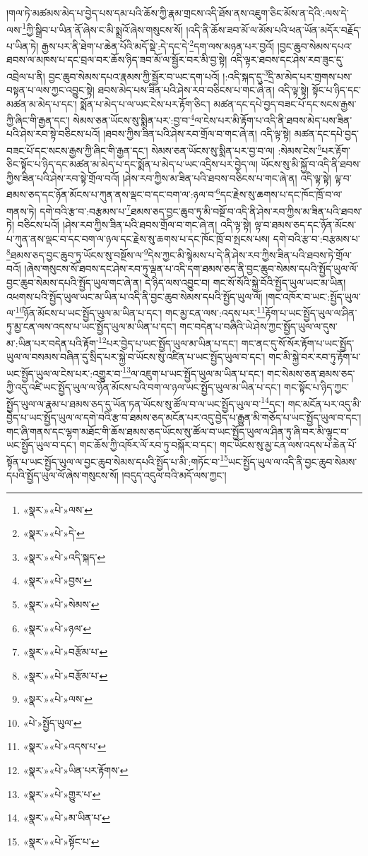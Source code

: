 །གལ་ཏེ་མཚམས་མེད་པ་བྱེད་པས་དམ་པའི་ཆོས་ཀྱི་རྣམ་གྲངས་འདི་ཐོས་ནས་འཇུག་ཅིང་མོས་ན་དེའི་:ལས་དེ་ལས་\footnote{«སྣར་»«པེ་»ལས་}ཀྱི་སྒྲིབ་པ་ཡིན་ནོ་ཞེས་ང་མི་སྨྲའོ་ཞེས་གསུངས་སོ། །འདི་ནི་ཆོས་ཟབ་མོ་ལ་མོས་པའི་ཕན་ཡོན་མདོར་བརྗོད་པ་ཡིན་ཏེ། རྒྱས་པར་ནི་ཐེག་པ་ཆེན་པོའི་མདོ་སྡེ་:དེ་དང་དེ་\footnote{«སྣར་»«པེ་»དེ་}དག་ལས་མཉན་པར་བྱའོ། །བྱང་ཆུབ་སེམས་དཔའ་ཐབས་ལ་མཁས་པ་དང་བྲལ་བར་ཆོས་ཉིད་ཟབ་མོ་ལ་སྦྱོར་བར་མི་བྱ་སྟེ། འདི་ལྟར་ཐབས་དང་ཤེས་རབ་ཟུང་དུ་འབྲེལ་པ་ནི། བྱང་ཆུབ་སེམས་དཔའ་རྣམས་ཀྱི་སྦྱོར་བ་ཡང་དག་པའོ། །:འདི་སྐད་དུ་\footnote{«སྣར་»«པེ་»འདི་སྐད་}དྲི་མ་མེད་པར་གྲགས་པས་བསྟན་པ་ལས་ཀྱང་འབྱུང་སྟེ། ཐབས་མེད་པས་ཟིན་པའི་ཤེས་རབ་བཅིངས་པ་གང་ཞེ་ན། འདི་ལྟ་སྟེ། སྟོང་པ་ཉིད་དང་མཚན་མ་མེད་པ་དང་། སྨོན་པ་མེད་པ་ལ་ཡང་ངེས་པར་རྟོག་ཅིང་། མཚན་དང་དཔེ་བྱད་བཟང་པོ་དང་སངས་རྒྱས་ཀྱི་ཞིང་གི་རྒྱན་དང་། སེམས་ཅན་ཡོངས་སུ་སྨིན་པར་:བྱ་བ་\footnote{«སྣར་»«པེ་»བྱས་}ལ་ངེས་པར་མི་རྟོག་པ་འདི་ནི་ཐབས་མེད་པས་ཟིན་པའི་ཤེས་རབ་སྟེ་བཅིངས་པའོ། །ཐབས་ཀྱིས་ཟིན་པའི་ཤེས་རབ་གྲོལ་བ་གང་ཞེ་ན། འདི་ལྟ་སྟེ། མཚན་དང་དཔེ་བྱད་བཟང་པོ་དང་སངས་རྒྱས་ཀྱི་ཞིང་གི་རྒྱན་དང་། སེམས་ཅན་ཡོངས་སུ་སྨིན་པར་བྱ་བ་ལ། :སེམས་ངེས་\footnote{«སྣར་»«པེ་»སེམས་}པར་རྟོག་ཅིང་སྟོང་པ་ཉིད་དང་མཚན་མ་མེད་པ་དང་སྨོན་པ་མེད་པ་ཡང་འདྲིས་པར་བྱེད་ལ། ཡོངས་སུ་མི་སྐྱོ་བ་འདི་ནི་ཐབས་ཀྱིས་ཟིན་པའི་ཤེས་རབ་སྟེ་གྲོལ་བའོ། །ཤེས་རབ་ཀྱིས་མ་ཟིན་པའི་ཐབས་བཅིངས་པ་གང་ཞེ་ན། འདི་ལྟ་སྟེ། ལྟ་བ་ཐམས་ཅད་དང་ཉོན་མོངས་པ་ཀུན་ནས་ལྡང་བ་དང་བག་ལ་:ཉལ་བ་\footnote{«སྣར་»«པེ་»ཉལ་}དང་རྗེས་སུ་ཆགས་པ་དང་ཁོང་ཁྲོ་བ་ལ་གནས་ཏེ། དགེ་བའི་རྩ་བ་:བརྩམས་པ་\footnote{«སྣར་»«པེ་»བརྩོམ་པ་}ཐམས་ཅད་བྱང་ཆུབ་ཏུ་མི་བསྔོ་བ་འདི་ནི་ཤེས་རབ་ཀྱིས་མ་ཟིན་པའི་ཐབས་ཏེ། བཅིངས་པའོ། །ཤེས་རབ་ཀྱིས་ཟིན་པའི་ཐབས་གྲོལ་བ་གང་ཞེ་ན། འདི་ལྟ་སྟེ། ལྟ་བ་ཐམས་ཅད་དང་ཉོན་མོངས་པ་ཀུན་ནས་ལྡང་བ་དང་བག་ལ་ཉལ་དང་རྗེས་སུ་ཆགས་པ་དང་ཁོང་ཁྲོ་བ་སྤངས་པས། དགེ་བའི་རྩ་བ་:བརྩམས་པ་\footnote{«སྣར་»«པེ་»བརྩོམ་པ་}ཐམས་ཅད་བྱང་ཆུབ་ཏུ་ཡོངས་སུ་བསྔོས་ལ་\footnote{«སྣར་»«པེ་»ལས་}དེས་ཀྱང་མི་སྙེམས་པ་དེ་ནི་ཤེས་རབ་ཀྱིས་ཟིན་པའི་ཐབས་ཏེ་གྲོལ་བའོ། །ཞེས་གསུངས་སོ་ཐབས་དང་ཤེས་རབ་ཏུ་ལྡན་པ་འདི་དག་ཐམས་ཅད་ནི་བྱང་ཆུབ་སེམས་དཔའི་སྤྱོད་ཡུལ་ལོ་བྱང་ཆུབ་སེམས་དཔའི་སྤྱོད་ཡུལ་གང་ཞེ་ན། དེ་ཉིད་ལས་འབྱུང་བ། གང་སོ་སོའི་སྐྱེ་བོའི་སྤྱོད་ཡུལ་ཡང་མ་ཡིན། འཕགས་པའི་སྤྱོད་ཡུལ་ཡང་མ་ཡིན་པ་འདི་ནི་བྱང་ཆུབ་སེམས་དཔའི་སྤྱོད་ཡུལ་ལོ། །གང་འཁོར་བ་ཡང་:སྤྱོད་ཡུལ་ལ་\footnote{«པེ་»སྤྱོད་ཡུལ་}ཉོན་མོངས་པ་ཡང་སྤྱོད་ཡུལ་མ་ཡིན་པ་དང་། གང་མྱ་ངན་ལས་:འདས་པར་\footnote{«སྣར་»«པེ་»འདས་པ་}རྟོག་པ་ཡང་སྤྱོད་ཡུལ་ལ་ཤིན་ཏུ་མྱ་ངན་ལས་འདས་པ་ཡང་སྤྱོད་ཡུལ་མ་ཡིན་པ་དང་། གང་བདེན་པ་བཞིའི་ཡེ་ཤེས་ཀྱང་སྤྱོད་ཡུལ་ལ་དུས་མ་:ཡིན་པར་བདེན་པའི་རྟོག་\footnote{«སྣར་»«པེ་»ཡིན་པར་རྟོགས་}པར་བྱེད་པ་ཡང་སྤྱོད་ཡུལ་མ་ཡིན་པ་དང་། གང་ནང་དུ་སོ་སོར་རྟོག་པ་ཡང་སྤྱོད་ཡུལ་ལ་བསམས་བཞིན་དུ་སྲིད་པར་སྐྱེ་བ་ཡོངས་སུ་འཛིན་པ་ཡང་སྤྱོད་ཡུལ་བ་དང་། གང་མི་སྐྱེ་བར་རབ་ཏུ་རྟོག་པ་ཡང་སྤྱོད་ཡུལ་ལ་ངེས་པར་:འགྱུར་བ་\footnote{«སྣར་»«པེ་»གྱུར་པ་}ལ་འཇུག་པ་ཡང་སྤྱོད་ཡུལ་མ་ཡིན་པ་དང་། གང་སེམས་ཅན་ཐམས་ཅད་ཀྱི་འདུ་འཛི་ཡང་སྤྱོད་ཡུལ་ལ་ཉོན་མོངས་པའི་བག་ལ་ཉལ་ཡང་སྤྱོད་ཡུལ་མ་ཡིན་པ་དང་། གང་སྟོང་པ་ཉིད་ཀྱང་སྤྱོད་ཡུལ་ལ་རྣམ་པ་ཐམས་ཅད་དུ་ཡོན་ཏན་ཡོངས་སུ་ཚོལ་བ་ལ་ཡང་སྤྱོད་ཡུལ་བ་\footnote{«སྣར་»«པེ་»མ་ཡིན་པ་}དང་། གང་མངོན་པར་འདུ་མི་བྱེད་པ་ཡང་སྤྱོད་ཡུལ་ལ་དགེ་བའི་རྩ་བ་ཐམས་ཅད་མངོན་པར་འདུ་བྱེད་པ་རྒྱུན་མི་གཅོད་པ་ཡང་སྤྱོད་ཡུལ་བ་དང་། གང་ཞི་གནས་དང་ལྷག་མཐོང་གི་ཆོས་ཐམས་ཅད་ཡོངས་སུ་ཚོལ་བ་ཡང་སྤྱོད་ཡུལ་ལ་ཤིན་ཏུ་ཞི་བར་མི་ལྟུང་བ་ཡང་སྤྱོད་ཡུལ་བ་དང་། གང་ཆོས་ཀྱི་འཁོར་ལོ་རབ་ཏུ་བསྐོར་བ་དང་། གང་ཡོངས་སུ་མྱ་ངན་ལས་འདས་པ་ཆེན་པོ་སྟོན་པ་ཡང་སྤྱོད་ཡུལ་ལ་བྱང་ཆུབ་སེམས་དཔའི་སྤྱོད་པ་མི་:གཏོང་བ་\footnote{«སྣར་»«པེ་»སྟོང་པ་}ཡང་སྤྱོད་ཡུལ་ལ་འདི་ནི་བྱང་ཆུབ་སེམས་དཔའི་སྤྱོད་ཡུལ་ལོ་ཞེས་གསུངས་སོ། །བདུད་འདུལ་བའི་མདོ་ལས་ཀྱང་། 